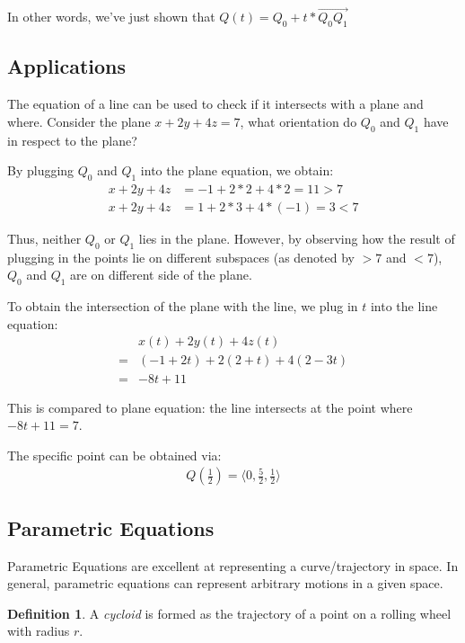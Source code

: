 \documentclass[12pt]{article}
\newcommand{\iv}[1]{\langle #1 \rangle}
\theoremstyle{definition}
\newtheorem{defn}{Definition}[section]
\begin{document}
	In other words, we've just shown that $Q(t) = Q_0 + t * \overrightarrow{Q_0Q_1}$
	
	\subsection{Applications}
	
	The equation of a line can be used to check if it intersects with a plane and where. Consider the plane $x + 2y + 4z = 7$, what orientation do $Q_0$ and $Q_1$ have in respect to the plane?
	
	By plugging $Q_0$ and $Q_1$ into the plane equation, we obtain:
	\begin{align*}
		x + 2y + 4z &= -1 + 2*2 + 4*2 = 11 > 7 \\
		x + 2y + 4z &= 1 + 2*3 + 4*(-1) = 3 < 7
	\end{align*}
	
	Thus, neither $Q_0$ or $Q_1$ lies in the plane. However, by observing how the result of plugging in the points lie on different subspaces (as denoted by $>7$ and $<7$), $Q_0$ and $Q_1$ are on different side of the plane.
	
	To obtain the intersection of the plane with the line, we plug in $t$ into the line equation:
	\begin{align*}
		&x(t) + 2y(t) + 4z(t) \\
		= &(-1 + 2t) + 2(2 + t) + 4(2 - 3t) \\
		= &-8t + 11
	\end{align*}
	
	This is compared to plane equation: the line intersects at the point where $-8t + 11 = 7$.
	
	The specific point can be obtained via:
	\begin{align*}
		Q(\frac{1}{2}) = \iv{0, \frac{5}{2}, \frac{1}{2}}
	\end{align*}
	
	\subsection{Parametric Equations}
	
	Parametric Equations are excellent at representing a curve/trajectory in space. In general, parametric equations can represent arbitrary motions in a given space.
	
	\begin{defn}
		A \emph{cycloid} is formed as the trajectory of a point on a rolling wheel with radius $r$.
	\end{defn}
	
\end{document}
